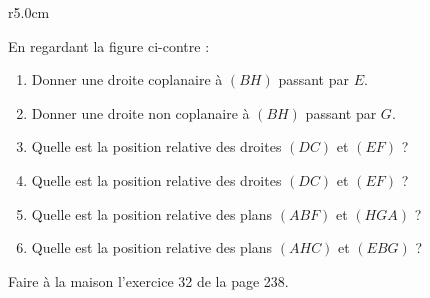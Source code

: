 
\begin{exercice}\label{exosmath-0079}

\begin{wrapfigure}{r}{5.0cm}
    \vspace{-0.8cm}
    \centering
    
\end{wrapfigure}

                En regardant la figure ci-contre :
        \begin{enumerate}
            \item
        Donner une droite coplanaire à \( (BH)\) passant par \( E\).
    \item
        Donner une droite non coplanaire à \( (BH)\) passant par \( G\).
    \item
        Quelle est la position relative des droites \( (DC)\) et \( (EF)\) ?
    \item
        Quelle est la position relative des droites \( (DC)\) et \( (EF)\) ?
    \item
        Quelle est la position relative des plans \( (ABF)\) et \( (HGA)\) ?
    \item
        Quelle est la position relative des plans \( (AHC)\) et \( (EBG)\) ?
                
        \end{enumerate}

        Faire à la maison l'exercice 32 de la page 238.

\end{exercice}
